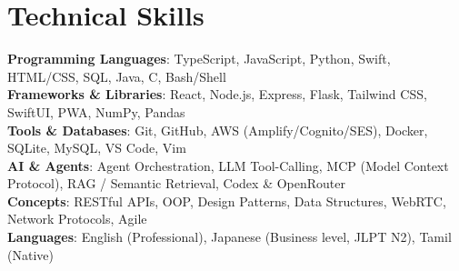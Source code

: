 \documentclass[letterpaper,11pt]{article}
\begin{document}
\section{Technical Skills}
 \begin{itemize}[leftmargin=0.15in, label={}]
    \small{\item{
     \textbf{Programming Languages}{: TypeScript, JavaScript, Python, Swift, HTML/CSS, SQL, Java, C, Bash/Shell} \\
     \textbf{Frameworks \& Libraries}{: React, Node.js, Express, Flask, Tailwind CSS, SwiftUI, PWA, NumPy, Pandas} \\
     \textbf{Tools \& Databases}{: Git, GitHub, AWS (Amplify/Cognito/SES), Docker, SQLite, MySQL, VS Code, Vim} \\
     \textbf{AI \& Agents}{: Agent Orchestration, LLM Tool-Calling, MCP (Model Context Protocol), RAG / Semantic Retrieval, Codex \& OpenRouter} \\
     \textbf{Concepts}{: RESTful APIs, OOP, Design Patterns, Data Structures, WebRTC, Network Protocols, Agile} \\
     \textbf{Languages}{: English (Professional), Japanese (Business level, JLPT N2), Tamil (Native)}
    }}
 \end{itemize}
\end{document}
